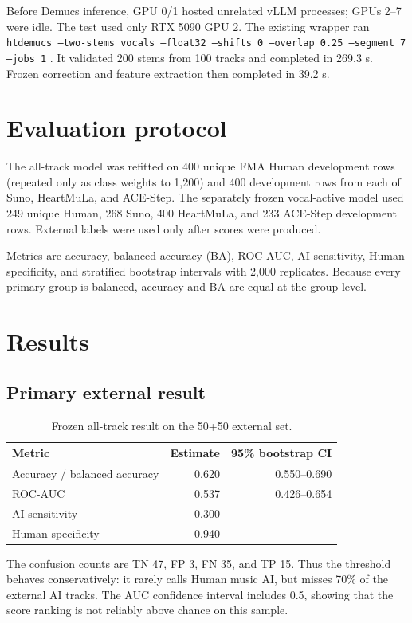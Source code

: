\documentclass[11pt,a4paper]{article}
\begin{document}
Before Demucs inference, GPU 0/1 hosted unrelated vLLM processes; GPUs 2--7 were idle. The test used only RTX 5090 GPU 2. The existing wrapper ran \texttt{htdemucs --two-stems vocals --float32 --shifts 0 --overlap 0.25 --segment 7 --jobs 1} \citep{demucs2021}. It validated 200 stems from 100 tracks and completed in 269.3 s. Frozen correction and feature extraction then completed in 39.2 s.

\section{Evaluation protocol}

The all-track model was refitted on 400 unique FMA Human development rows (repeated only as class weights to 1,200) and 400 development rows from each of Suno, HeartMuLa, and ACE-Step. The separately frozen vocal-active model used 249 unique Human, 268 Suno, 400 HeartMuLa, and 233 ACE-Step development rows. External labels were used only after scores were produced.

Metrics are accuracy, balanced accuracy (BA), ROC-AUC, AI sensitivity, Human specificity, and stratified bootstrap intervals with 2,000 replicates. Because every primary group is balanced, accuracy and BA are equal at the group level.

\section{Results}

\subsection{Primary external result}

\begin{table}[H]
\centering
\caption{Frozen all-track result on the 50+50 external set.}
\begin{tabular}{lrr}
\toprule
Metric & Estimate & 95\% bootstrap CI \\
\midrule
Accuracy / balanced accuracy & 0.620 & 0.550--0.690 \\
ROC-AUC & 0.537 & 0.426--0.654 \\
AI sensitivity & 0.300 & --- \\
Human specificity & 0.940 & --- \\
\bottomrule
\end{tabular}
\end{table}

The confusion counts are TN 47, FP 3, FN 35, and TP 15. Thus the threshold behaves conservatively: it rarely calls Human music AI, but misses 70\% of the external AI tracks. The AUC confidence interval includes 0.5, showing that the score ranking is not reliably above chance on this sample.
\end{document}
